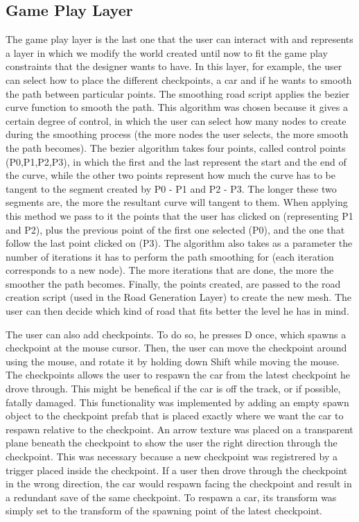 \documentclass[conference]{IEEEtran}
\begin{document}
\subsection{Game Play Layer}

The game play layer is the last one that the user can interact with and represents a layer in which we modify the world created until now to fit the game play constraints that the designer wants to have. In this layer, for example, the user can select how to place the different checkpoints, a car and if he wants to smooth the path between particular points. \newline\newline
The smoothing road script applies the bezier curve function to smooth the path. This algorithm was chosen because it gives a certain degree of control, in which the user can select how many nodes to create during the smoothing process (the more nodes the user selects, the more smooth the path becomes). The bezier algorithm takes four points, called control points (P0,P1,P2,P3), in which the first and the last represent the start and the end of the curve, while the other two points represent how much the curve has to be tangent to the segment created by P0 - P1 and P2 - P3. The longer these two segments are, the more the resultant curve will tangent to them. When applying this method we pass to it the points that the user has clicked on (representing P1 and P2), plus the previous point of the first one selected (P0), and the one that follow the last point clicked on (P3). The algorithm also takes as a parameter the number of iterations it has to perform the path smoothing for (each iteration corresponds to a new node). The more iterations that are done, the more the smoother the path becomes. Finally, the points created, are passed to the road creation script (used in the Road Generation Layer) to create the new mesh.
The user can then decide which kind of road that fits better the level he has in mind.\newline\newline

The user can also add checkpoints. To do so, he presses D once, which spawns a checkpoint at the mouse cursor. Then, the user can move the checkpoint around using the mouse, and rotate it by holding down Shift while moving the mouse. The checkpoints allows the user to respawn the car from the latest checkpoint he drove through. This might be benefical if the car is off the track, or if possible, fatally damaged. This functionality was implemented by adding an empty spawn object to the checkpoint prefab that is placed exactly where we want the car to respawn relative to the checkpoint. An arrow texture was placed on a transparent plane beneath the checkpoint to show the user the right direction through the checkpoint. This was necessary because a new checkpoint was registrered by a trigger placed inside the checkpoint. If a user then drove through the checkpoint in the wrong direction, the car would respawn facing the checkpoint and result in a redundant save of the same checkpoint. To respawn a car, its transform was simply set to the transform of the spawning point of the latest checkpoint.
\end{document}
